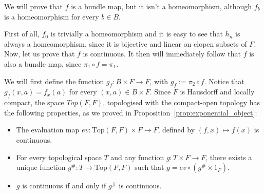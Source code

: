 \begin{example}
\begin{center}
\end{center}
We will prove that $f$ is a bundle map, but it isn't a homeomorphism, although $f_b$ is a homeomorphism for every $b\in B$.

First of all, $f_0$ is trivially a homeomorphism and it is easy to see that $h_n$ is always a homeomorphism, since it is bijective and linear on clopen subsets of $F$. Now, let us prove that $f$ is continuous. It then will immediately follow that $f$ is also a bundle map, since $\pi_1\circ f=\pi_1$.

We will first define the function $g_f:B\times F\to F$, with $g_f:=\pi_2\circ f$. Notice that $g_f(x,a)=f_x(a)$ for every $(x,a)\in B\times F$. Since $F$ is Hausdorff and locally compact, the space $Top(F,F)$, topologised with the compact-open topology has the following properties, as we proved in Proposition~\ref{prop:exponential_object}:
\begin{itemize}
\item The evaluation map $ev:\mathrm{Top}(F,F)\times F\to F$, defined by $(f,x)\mapsto f(x)$ is continuous.
\item For every topological space $T$ and any function $g:T\times F\to F$, there exists a unique function $g^{\#}:T\to\mathrm{Top}(F,F)$ such that $g=ev\circ(g^{\#}\times 1_F)$.
\item $g$ is continuous if and only if $g^{\#}$ is continuous.
\end{itemize}


\end{example}
